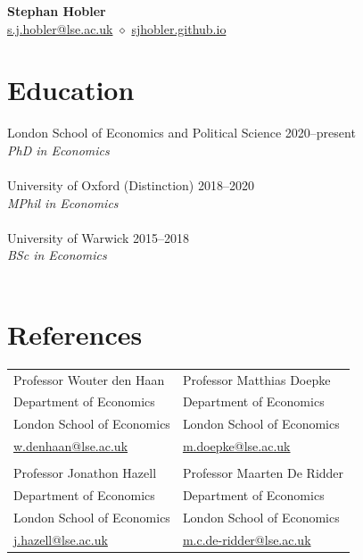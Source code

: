 \documentclass[10pt,a4paper]{article}
\newcommand{\cventry}[4][]{%
  #2 \hfill #3\\
  \textit{#4} \hfill \\
  #1 \\ [-0.3em]
}
\begin{document}
\begin{center}
	{\LARGE \textbf{Stephan Hobler}}\\[0.8em]
	\href{mailto:s.j.hobler@lse.ac.uk}{s.j.hobler@lse.ac.uk} \qquad $\diamond$ \qquad \href{https://sjhobler.github.io/}{sjhobler.github.io}
\end{center}

\section{Education}
\cventry{London School of Economics and Political Science}{2020--present} %
{PhD in Economics}

\cventry{University of Oxford (Distinction)}{2018--2020}
{MPhil in Economics}

\cventry{University of Warwick}{2015--2018}
{BSc in Economics}

\vspace{-1em}
\section{References}
\begin{tabularx}{\textwidth}{XX}
	Professor Wouter den Haan                              & Professor Matthias Doepke                                      \\
	Department of Economics                                & Department of Economics                                        \\
	London School of Economics                             & London School of Economics                                     \\
	\href{mailto:w.denhaan@lse.ac.uk}{w.denhaan@lse.ac.uk} & \href{mailto:m.doepke@lse.ac.uk}{m.doepke@lse.ac.uk}           \\
	                                                       &                                                                \\
	Professor Jonathon Hazell                              & Professor Maarten De Ridder                                    \\
	Department of Economics                                & Department of Economics                                        \\
	London School of Economics                             & London School of Economics                                     \\
	\href{mailto:j.hazell@lse.ac.uk}{j.hazell@lse.ac.uk}   & \href{mailto:m.c.de-ridder@lse.ac.uk}{m.c.de-ridder@lse.ac.uk} \\
\end{tabularx}
\vspace{0.5em}
\end{document}
